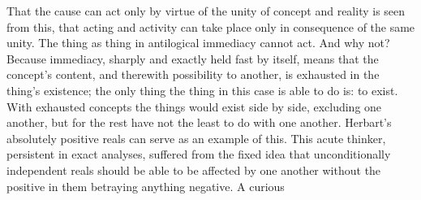 \documentclass[12pt]{article}
\begin{document}
That the cause can act only by virtue of the unity of concept and reality is
seen from this, that acting and activity can take place only in consequence
of the same unity. The thing as thing in antilogical immediacy cannot act.
And why not? Because
immediacy, sharply and exactly held fast by itself, means that the concept's
content, and therewith possibility to another, is exhausted in the thing's
existence; the only thing the thing in this case is able to do is: to exist.
With exhausted concepts the things would exist side by side, excluding one
another, but for the rest have not the least to do with one another.
Herbart's absolutely positive reals can serve as an example of this. This
acute thinker, persistent in exact analyses, suffered from the fixed idea
that unconditionally independent reals should be able to be affected by one
another without the positive in them betraying anything negative. A curious
\end{document}
